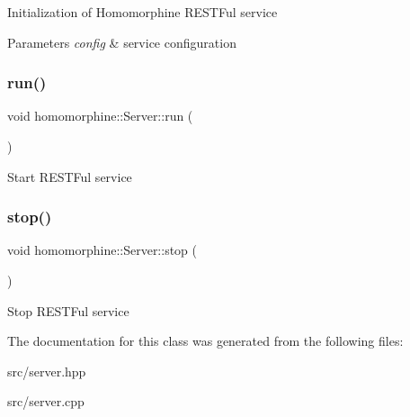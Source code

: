 Initialization of Homomorphine R\+E\+S\+T\+Ful service


\begin{DoxyParams}{Parameters}
{\em config} & service configuration \\
\hline
\end{DoxyParams}
\mbox{\label{classhomomorphine_1_1_server_a02ae1a9f2334652a64a498e6a6efc4b1}} 
\subsubsection{\texorpdfstring{run()}{run()}}
{\footnotesize\ttfamily void homomorphine\+::\+Server\+::run (\begin{DoxyParamCaption}{ }\end{DoxyParamCaption})}

Start R\+E\+S\+T\+Ful service \mbox{\label{classhomomorphine_1_1_server_a5655dfcc0a213e6bf1f8d35dbadebf4d}} 
\subsubsection{\texorpdfstring{stop()}{stop()}}
{\footnotesize\ttfamily void homomorphine\+::\+Server\+::stop (\begin{DoxyParamCaption}{ }\end{DoxyParamCaption})}

Stop R\+E\+S\+T\+Ful service 

The documentation for this class was generated from the following files\+:\begin{DoxyCompactItemize}
\item 
src/server.\+hpp\item 
src/server.\+cpp\end{DoxyCompactItemize}
